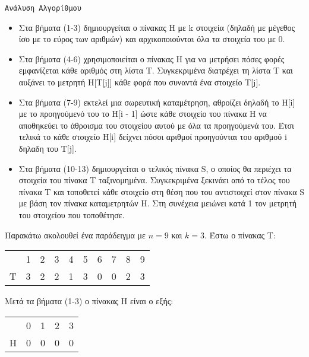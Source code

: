 \documentclass[a4paper, fleqn]{article}
\begin{document}
\pagebreak
\texttt{Ανάλυση Αλγορίθμου} 
\begin{itemize}
\item Στα βήματα (1-3) δημιουργείται ο πίνακας H με k στοιχεία (δηλαδή  με μέγεθος ίσο με το εύρος των αριθμών) και αρχικοποιούνται όλα τα στοιχεία του με 0.

\item Στα βήματα (4-6) χρησιμοποιείται ο πίνακας H για να μετρήσει πόσες φορές εμφανίζεται κάθε αριθμός στη λίστα T. Συγκεκριμένα διατρέχει τη λίστα T και αυξάνει το μετρητή H[T[j]] κάθε φορά που συναντά ένα στοιχείο T[j].

\item Στα βήματα (7-9) εκτελεί μια σωρευτική καταμέτρηση, αθροίζει δηλαδή το H[i] με το προηγούμενό του το H[i - 1] ώστε κάθε στοιχείο του πίνακα H να αποθηκεύει το άθροισμα του στοιχείου αυτού με όλα τα προηγούμενά του. Έτσι τελικά το κάθε στοιχείο H[i] δείχνει πόσοι αριθμοί προηγούνται του αριθμού i δηλαδη του T[j].

\item Στα βήματα (10-13) δημιουργείται ο τελικός πίνακα S, ο οποίος θα περιέχει τα στοιχεία του πίνακα T ταξινομημένα. Συγκεκριμένα ξεκινάει από το τέλος του πίνακα T και τοποθετεί κάθε στοιχείο στη θέση που του αντιστοιχεί στον πίνακα S με βάση τον πίνακα καταμετρητών H. Στη συνέχεια μειώνει κατά 1 τον μετρητή του στοιχείου που τοποθέτησε.
\end{itemize}
Παρακάτω ακολουθεί ένα παράδειγμα με $n=9$ και $k=3$. Έστω ο πίνακας T:
\begin{center}
\begin{tabular}{r|c|c|c|c|c|c|c|c|c|}
\multicolumn{1}{r}{} & \multicolumn{1}{c}{1} & \multicolumn{1}{c}{2} & \multicolumn{1}{c}{3} & \multicolumn{1}{c}{4} & \multicolumn{1}{c}{5} & \multicolumn{1}{c}{6} & \multicolumn{1}{c}{7} & \multicolumn{1}{c}{8} & \multicolumn{1}{c}{9}\\
\cline{2-10}
T & 3 & 2 & 2 & 1 & 3 & 0 & 0 & 2 & 3\\
\cline{2-10}
\end{tabular}\par
\end{center}
Μετά τα βήματα (1-3) ο πίνακας H είναι ο εξής:
\begin{center}
\begin{tabular}{r|c|c|c|c|}
\multicolumn{1}{r}{} & \multicolumn{1}{c}{0} & \multicolumn{1}{c}{1} & \multicolumn{1}{c}{2} & \multicolumn{1}{c}{3} \\
\cline{2-5}
H & 0 & 0 & 0 & 0 \\
\cline{2-5}
\end{tabular}\par
\end{center}
\end{document}
